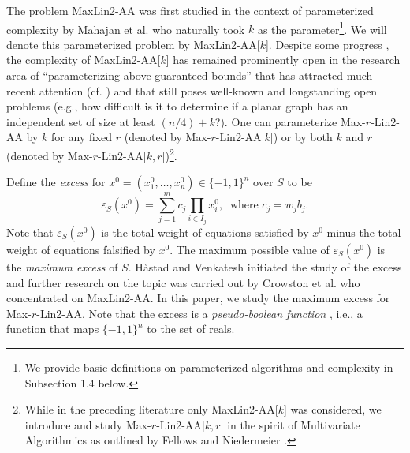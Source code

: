 \documentclass{llncs}
\begin{document}
The problem {\sc MaxLin2-AA} was first studied in the context of parameterized complexity by Mahajan
et al. \cite{MahajanRamanSikdar09} who naturally took $k$ as the parameter\footnote{We provide basic definitions on parameterized algorithms and complexity in Subsection 1.4 below.}.
We will denote this parameterized problem by {\sc MaxLin2-AA}[$k$]. Despite some progress
\cite{CroGutJon10,CroGutJonKimRuz10,GutKimSzeYeo11}, the complexity of {\sc MaxLin2-AA}[$k$] has remained prominently open
in the research area of ``parameterizing above guaranteed bounds'' that has attracted much recent attention (cf.
\cite{AloGutKimSzeYeo11,BolSco2002,CroGutJon10,CroGutJonKimRuz10,GutKimSzeYeo11,KimWil,MahajanRamanSikdar09})
and that still poses well-known and longstanding open problems (e.g., how difficult is it to determine if a planar graph
has an independent set of size at least $(n/4)+k$?).
One can parameterize {\sc Max-$r$-Lin2-AA} by $k$ for any fixed $r$  (denoted by {\sc Max-$r$-Lin2-AA}[$k$]) or
by both $k$ and $r$ (denoted by {\sc Max-$r$-Lin2-AA}[$k,r$])\footnote{While in the preceding literature only
{\sc MaxLin2-AA}[$k$] was considered, we introduce and study {\sc Max-$r$-Lin2-AA}[$k,r$] in the spirit of
Multivariate Algorithmics as outlined by Fellows \cite{FelIWOCA} and Niedermeier \cite{Niedermeier10}.}.

Define the \emph{excess} for $x^0=(x^0_1,\ldots ,x^0_n)\in \{-1, 1\}^n$ over $S$ to be
$$\varepsilon_S(x^0)=\sum_{j=1}^m c_j\prod_{i\in I_j}x^0_i,\ \mbox{ where } c_j=w_{j}b_j.$$
Note that $\varepsilon_S(x^0)$ is the total weight of  equations satisfied by $x^0$
minus the total weight of equations falsified by $x^0$.
The maximum possible value of $\varepsilon_S(x^0)$ is the {\em maximum excess} of $S$.
H\aa stad and Venkatesh \cite{HasVen04} initiated the study of the excess and further research on the topic
was carried out by Crowston et al. \cite{CroGutJonKimRuz10} who concentrated on {\sc MaxLin2-AA}.
In this paper, we study the maximum excess for {\sc Max-$r$-Lin2-AA}.
Note that the excess is a {\em pseudo-boolean function} \cite{BorHam2002},
i.e., a function that maps $\{-1,1\}^n$ to the set of reals.

\vspace{3mm}
\end{document}

